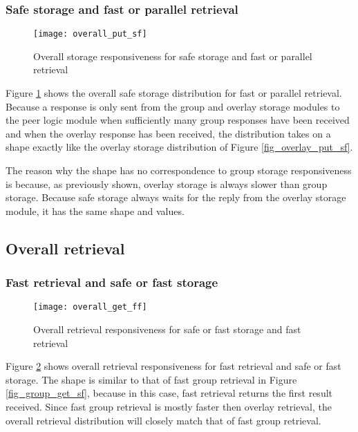 \subsubsection{Safe storage and fast or parallel retrieval}
\begin{figure}[htbp]
 \centering
 \texttt{[image: overall\_put\_sf]}
 \caption{Overall storage responsiveness for safe storage and fast or parallel retrieval}
 \label{fig_overall_put_sf}
\end{figure}
%
Figure \ref{fig_overall_put_sf} shows the overall safe storage distribution for fast or parallel retrieval. Because a response is only sent from the group and overlay storage modules to the peer logic module when sufficiently many group responses have been received and when the overlay response has been received, the distribution takes on a shape exactly like the overlay storage distribution of Figure \ref{fig_overlay_put_sf}.

The reason why the shape has no correspondence to group storage responsiveness is because, as previously shown, overlay storage is always slower than group storage. Because safe storage always waits for the reply from the overlay storage module, it has the same shape and values.

\subsection{Overall retrieval}
\subsubsection{Fast retrieval and safe or fast storage}
\begin{figure}[htbp]
 \centering
 \texttt{[image: overall\_get\_ff]}
 \caption{Overall retrieval responsiveness for safe or fast storage and fast retrieval}
 \label{fig_overall_get_ff}
\end{figure}
%
Figure \ref{fig_overall_get_ff} shows overall retrieval responsiveness for fast retrieval and safe or fast storage. The shape is similar to that of fast group retrieval in Figure \ref{fig_group_get_sf}, because in this case, fast retrieval returns the first result received. Since fast group retrieval is mostly faster then overlay retrieval, the overall retrieval distribution will closely match that of fast group retrieval.

